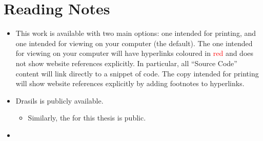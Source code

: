 \chapter{Reading Notes}
\label{chap:reading_notes}

\begin{itemize}

    \item This work is available with two main options: one intended for
          printing, and one intended for viewing on your computer (the default).
          The one intended for viewing on your computer will have hyperlinks
          coloured in \textcolor{red}{red} and does not show website references
          explicitly. In particular, all ``Source Code'' content will link
          directly to a snippet of code. The copy intended for printing will
          show website references explicitly by adding footnotes to hyperlinks.

    \item Drasils  is publicly
          available.

          \begin{itemize}

              \item Similarly, the 
                    for this thesis is public. 

          \end{itemize}

    \item {}

\end{itemize}
